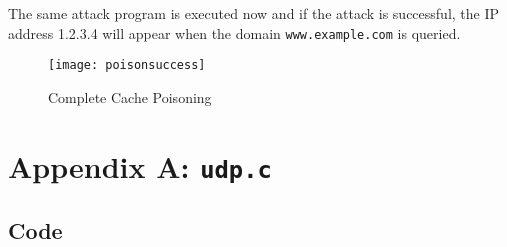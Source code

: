 \documentclass[a4paper,12pt]{article}
\begin{document}
		The same attack program is executed now and if the attack is successful, the IP address 1.2.3.4 will appear when the domain \texttt{www.example.com} is queried.
		
\begin{figure}[H]
\centering
\texttt{[image: poisonsuccess]}
\caption{Complete Cache Poisoning}
\label{fig:poisonsuccess}
\end{figure}

		
		\section{Appendix A: \texttt{udp.c}}
		\subsection{Code}
		\label{AppA}
		
\end{document}

